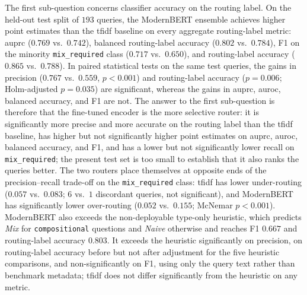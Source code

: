 \documentclass[english, bibtex]{kththesis}               %
\numberwithin{listing}{chapter}
\begin{document}
The first sub-question concerns classifier accuracy on the routing label. On the held-out test split of $193$ queries, the ModernBERT ensemble achieves higher point estimates than the \gls{tfidf} baseline on every aggregate routing-label metric: \gls{auprc} ($0.769$ vs.\ $0.742$), balanced routing-label accuracy ($0.802$ vs.\ $0.784$), F1 on the minority \texttt{mix\_required} class ($0.717$ vs.\ $0.650$), and routing-label accuracy ($0.865$ vs.\ $0.788$). In paired statistical tests on the same test queries, the gains in precision ($0.767$ vs.\ $0.559$, $p < 0.001$) and routing-label accuracy ($p = 0.006$; Holm-adjusted $p = 0.035$) are significant, whereas the gains in \gls{auprc}, \gls{auroc}, balanced accuracy, and F1 are not. The answer to the first sub-question is therefore that the fine-tuned encoder is the more selective router: it is significantly more precise and more accurate on the routing label than the \gls{tfidf} baseline, has higher but not significantly higher point estimates on \gls{auprc}, \gls{auroc}, balanced accuracy, and F1, and has a lower but not significantly lower recall on \texttt{mix\_required}; the present test set is too small to establish that it also ranks the queries better. The two routers place themselves at opposite ends of the precision--recall trade-off on the \texttt{mix\_required} class: \gls{tfidf} has lower under-routing ($0.057$ vs.\ $0.083$; $6$ vs.\ $1$ discordant queries, not significant), and ModernBERT has significantly lower over-routing ($0.052$ vs.\ $0.155$; McNemar $p < 0.001$). ModernBERT also exceeds the non-deployable type-only heuristic, which predicts \emph{Mix} for \texttt{compositional} questions and \emph{Naive} otherwise and reaches F1 $0.667$ and routing-label accuracy $0.803$. It exceeds the heuristic significantly on precision, on routing-label accuracy before but not after adjustment for the five heuristic comparisons, and non-significantly on F1, using only the query text rather than benchmark metadata; \gls{tfidf} does not differ significantly from the heuristic on any metric.
\end{document}
